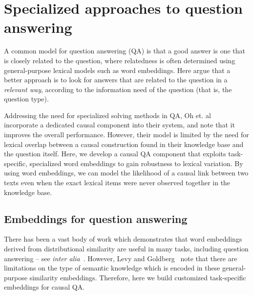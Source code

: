 \section{Specialized approaches to question answering}

A common model for question answering (QA) is that a good answer is one that is closely related to the question, where relatedness is often determined using general-purpose lexical models such as word embeddings. 
Here argue that a better approach is to look for answers that are related to the question in a {\em relevant way}, according to the information need of the question (that is, the question type).

Addressing the need for specialized solving methods in QA, Oh et. al~\citeyear{oh2013question} incorporate a dedicated causal component into their system, and note that it improves the overall performance.  However, their model is limited by the need for lexical overlap between a causal construction found in their knowledge base and the question itself.  Here, we develop a causal QA component that exploits task-specific, specialized word embeddings to gain robustness to lexical variation.  
By using word embeddings, we can model the likelihood of a causal link between two texts even when the exact lexical items were never observed together in the knowledge base.

\subsection{Embeddings for question answering}
There has been a vast body of work which demonstrates that word embeddings derived from distributional similarity are useful in many tasks, including question answering -- see \emph{inter alia}~\mbox{\cite{fried2015higher,yih13}}.  However, Levy and Goldberg~\citeyear{levy2015supervised} note that there are limitations on the type of semantic knowledge which is encoded in these general-purpose similarity embeddings.  Therefore, here we build customized task-specific embeddings for causal QA.

